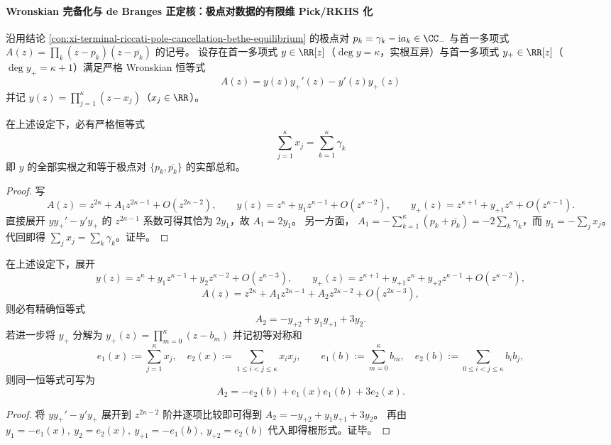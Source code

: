 
\paragraph{Wronskian 完备化与 de Branges 正定核：极点对数据的有限维 Pick/RKHS 化}
沿用结论 \ref{con:xi-terminal-riccati-pole-cancellation-bethe-equilibrium} 的极点对 \(p_k=\gamma_k-\mathrm{i}a_k\in\CC_{-}\) 与首一多项式 \(A(z)=\prod_k(z-p_k)(z-\overline{p_k})\) 的记号。
设存在首一多项式 \(y\in\RR[z]\)（\(\deg y=\kappa\)，实根互异）与首一多项式 \(y_{+}\in\RR[z]\)（\(\deg y_{+}=\kappa+1\)）满足严格 Wronskian 恒等式
\[
\boxed{\;A(z)=y(z)y_{+}'(z)-y'(z)y_{+}(z)\;}
\]
并记 \(y(z)=\prod_{j=1}^{\kappa}(z-x_j)\)（\(x_j\in\RR\)）。

\begin{conclusion}\label{con:xi-terminal-wronskian-centroid-identity}
在上述设定下，必有严格恒等式
\[
\boxed{\;\sum_{j=1}^{\kappa}x_j=\sum_{k=1}^{\kappa}\gamma_k\;}
\]
即 \(y\) 的全部实根之和等于极点对 \(\{p_k,\overline{p_k}\}\) 的实部总和。
\end{conclusion}
\begin{proof}
写
\[
A(z)=z^{2\kappa}+A_1z^{2\kappa-1}+O(z^{2\kappa-2}),\qquad
y(z)=z^{\kappa}+y_1z^{\kappa-1}+O(z^{\kappa-2}),\qquad
y_{+}(z)=z^{\kappa+1}+y_{+1}z^{\kappa}+O(z^{\kappa-1}).
\]
直接展开 \(yy_{+}'-y'y_{+}\) 的 \(z^{2\kappa-1}\) 系数可得其恰为 \(2y_1\)，故 \(A_1=2y_1\)。
另一方面，
\(
A_1=-\sum_{k=1}^{\kappa}(p_k+\overline{p_k})=-2\sum_k\gamma_k
\)，而 \(y_1=-\sum_j x_j\)。
代回即得 \(\sum_j x_j=\sum_k\gamma_k\)。证毕。
\end{proof}

\begin{conclusion}\label{con:xi-terminal-wronskian-second-symmetric-sum-coupling}
在上述设定下，展开
\[
y(z)=z^{\kappa}+y_1z^{\kappa-1}+y_2z^{\kappa-2}+O(z^{\kappa-3}),\qquad
y_{+}(z)=z^{\kappa+1}+y_{+1}z^{\kappa}+y_{+2}z^{\kappa-1}+O(z^{\kappa-2}),
\]
\[
A(z)=z^{2\kappa}+A_1z^{2\kappa-1}+A_2z^{2\kappa-2}+O(z^{2\kappa-3}),
\]
则必有精确恒等式
\[
\boxed{\;A_2=-y_{+2}+y_1y_{+1}+3y_2.\;}
\]
若进一步将 \(y_{+}\) 分解为
\(
y_{+}(z)=\prod_{m=0}^{\kappa}(z-b_m)
\)
并记初等对称和
\[
e_1(x):=\sum_{j=1}^{\kappa}x_j,\quad e_2(x):=\sum_{1\le i<j\le \kappa}x_ix_j,\qquad
e_1(b):=\sum_{m=0}^{\kappa}b_m,\quad e_2(b):=\sum_{0\le i<j\le \kappa}b_ib_j,
\]
则同一恒等式可写为
\[
\boxed{\;A_2=-e_2(b)+e_1(x)e_1(b)+3e_2(x).\;}
\]
\end{conclusion}
\begin{proof}
将 \(yy_{+}'-y'y_{+}\) 展开到 \(z^{2\kappa-2}\) 阶并逐项比较即可得到
\(
A_2=-y_{+2}+y_1y_{+1}+3y_2
\)。
再由
\(
y_1=-e_1(x),\ y_2=e_2(x),\ y_{+1}=-e_1(b),\ y_{+2}=e_2(b)
\)
代入即得根形式。证毕。
\end{proof}

